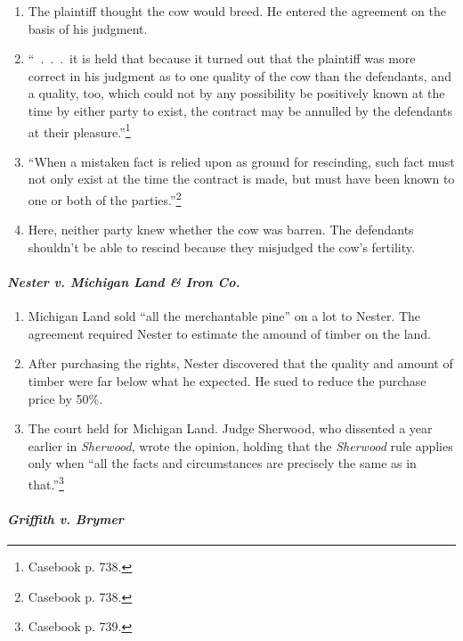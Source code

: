 \begin{enumerate}
    \begin{enumerate}
        \item The plaintiff thought the cow would breed. He entered the 
        agreement on the basis of his judgment. 
        \item ``~.~.~.~it is held that because it turned out that the 
        plaintiff was more correct in his judgment as to one quality of the 
        cow than the defendants, and a quality, too, which could not by any 
        possibility be positively known at the time by either party to exist, 
        the contract may be annulled by the defendants at their 
        pleasure.''\footnote{Casebook p. 738.}
        \item ``When a mistaken fact is relied upon as ground for rescinding, 
        such fact must not only exist at the time the contract is made, but 
        must have been known to one or both of the 
        parties.''\footnote{Casebook p. 738.}
        \item Here, neither party knew whether the cow was barren. The 
        defendants shouldn't be able to rescind because they misjudged the 
        cow's fertility.
    \end{enumerate}
\end{enumerate}

\paragraph{\emph{Nester v. Michigan Land \& Iron Co.}}

\begin{enumerate}
    \item Michigan Land sold ``all the merchantable pine'' on a lot to Nester. 
    The agreement required Nester to estimate the amound of timber on the 
    land.
    \item After purchasing the rights, Nester discovered that the quality and 
    amount of timber were far below what he expected. He sued to reduce the 
    purchase price by 50\%.
    \item The court held for Michigan Land. Judge Sherwood, who dissented a 
    year earlier in \emph{Sherwood}, wrote the opinion, holding that the 
    \emph{Sherwood} rule applies only when ``all the facts and circumstances 
    are precisely the same as in that.''\footnote{Casebook p. 739.}
\end{enumerate}

\paragraph{\emph{Griffith v. Brymer}}

